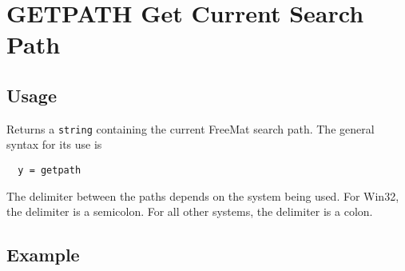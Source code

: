 \section{GETPATH Get Current Search Path}

\subsection{Usage}

Returns a \verb|string| containing the current FreeMat search path.  The general syntax for
its use is
\begin{verbatim}
  y = getpath
\end{verbatim}
The delimiter between the paths depends on the system being used.  For Win32, the
delimiter is a semicolon.  For all other systems, the delimiter is a colon.

\subsection{Example}

